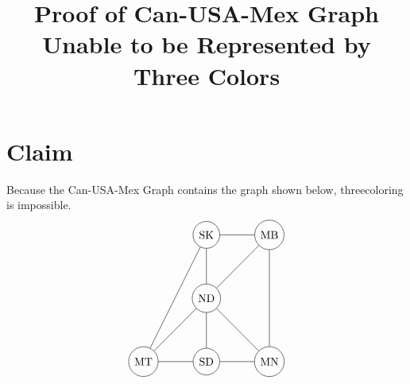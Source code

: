 \documentclass[10 pt]{amsart}
\theoremstyle{definition}
\theoremstyle{remark}
\numberwithin{equation}{subsection}
\begin{document}
\title{Proof of Can-USA-Mex Graph Unable to be Represented by Three Colors}
\author{}

\email{} \maketitle

\section*{Claim}
Because the Can-USA-Mex Graph contains the graph shown below, three\newline coloring is impossible.
\[
\begin{tikzpicture}
\node[circle, draw] (MT) at (0,0){MT};
\node[circle, draw] (SK) at (2,4){SK};
\node[circle, draw] (ND) at (2,2){ND};
\node[circle, draw] (SD) at (2,0){SD};
\node[circle, draw] (MB) at (4,4){MB};
\node[circle, draw] (MN) at (4,0){MN};
\foreach \from/\to in 
{MT/SK,MT/ND,MT/SD,SK/ND,SK/MB,MB/ND,MB/MN,ND/SD,ND/MN,SD/MN}
\draw (\from) -- (\to);
\end{tikzpicture}
\]
\end{document}
